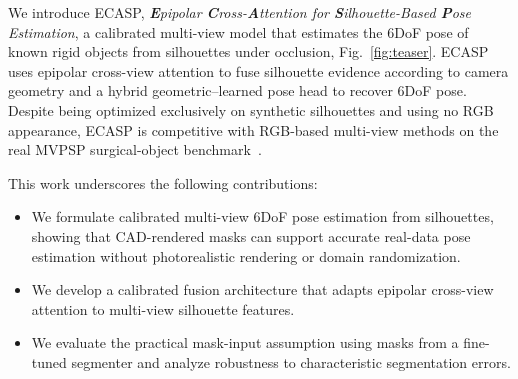 We introduce ECASP, \emph{\textbf{E}pipolar \textbf{C}ross-\textbf{A}ttention for \textbf{S}ilhouette-Based \textbf{P}ose Estimation}, a calibrated multi-view model that estimates the 6DoF pose of known rigid objects from silhouettes under occlusion, Fig.~\ref{fig:teaser}.
ECASP uses epipolar cross-view attention to fuse silhouette evidence according to camera geometry and a hybrid geometric--learned pose head to recover 6DoF pose.
Despite being optimized exclusively on synthetic silhouettes and using no RGB appearance, ECASP is competitive with RGB-based multi-view methods on the real MVPSP surgical-object benchmark~\cite{hein2025surgicalnavigation}.

This work underscores the following contributions:

\begin{itemize}
    \item We formulate calibrated multi-view 6DoF pose estimation from silhouettes, showing that CAD-rendered masks can support accurate real-data pose estimation without photorealistic rendering or domain randomization.

    \item We develop a calibrated fusion architecture that adapts epipolar cross-view attention to multi-view silhouette features.

    \item We evaluate the practical mask-input assumption using masks from a
    fine-tuned segmenter and analyze robustness to characteristic segmentation
    errors.
\end{itemize}
